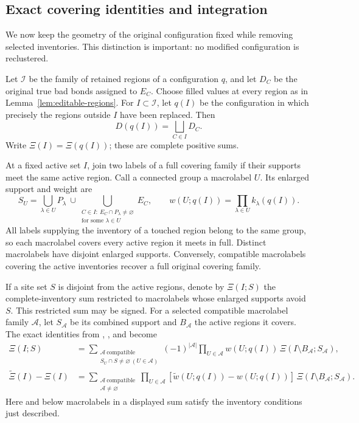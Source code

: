 \subsection{Exact covering identities and integration}

We now keep the geometry of the original configuration fixed while
removing selected inventories. This distinction is important: no
modified configuration is reclustered.

Let $\mathcal I$ be the family of retained regions of a configuration
$q$, and let $D_C$ be the original true bad bonds assigned to $E_C$.
Choose filled values at every region as in
Lemma~\ref{lem:editable-regions}. For $I\subset\mathcal I$, let $q(I)$
be the configuration in which precisely the regions outside $I$ have
been replaced. Then
\begin{equation}
 D(q(I))=\bigsqcup_{C\in I}D_C.
 \label{eq:comparison-inventory-edit}
\end{equation}
Write $\Xi(I)=\Xi(q(I))$; these are complete positive sums.

At a fixed active set $I$, join two labels of a full covering family
if their supports meet the same active region. Call a connected group
a macrolabel $U$. Its enlarged support and weight are
\[
 S_U=\bigcup_{\lambda\in U}P_\lambda
 \ \cup\!
 \bigcup_{\substack{C\in I:\ E_C\cap P_\lambda\ne\varnothing\\
                                  \text{for some }\lambda\in U}}E_C,
 \qquad
 w(U;q(I))=\prod_{\lambda\in U}k_\lambda(q(I)).
\]
All labels supplying the inventory of a touched region belong to the
same group, so each macrolabel covers every active region it meets
in full. Distinct macrolabels have disjoint enlarged supports.
Conversely, compatible macrolabels covering the active inventories
recover a full original covering family.

If a site set $S$ is disjoint from the active regions, denote by
$\Xi(I;S)$ the complete-inventory sum restricted to macrolabels
whose enlarged supports avoid $S$. This restricted sum may be signed.
For a selected compatible macrolabel family $\mathcal A$, let
$S_{\mathcal A}$ be its combined support and $B_{\mathcal A}$ the
active regions it covers. The exact identities from
, , and
 become
\begin{align}
 \Xi(I;S)
 &=\sum_{\substack{\mathcal A\ \mathrm{compatible}\\
          S_U\cap S\ne\varnothing\ (U\in\mathcal A)}}
 (-1)^{|\mathcal A|}
 \prod_{U\in\mathcal A}w(U;q(I))\,
 \Xi(I\setminus B_{\mathcal A};S_{\mathcal A}),
 \label{eq:comparison-inclusion-exclusion}\\
 \widetilde\Xi(I)-\Xi(I)
 &=\sum_{\substack{\mathcal A\ \mathrm{compatible}\\
                              \mathcal A\ne\varnothing}}
 \prod_{U\in\mathcal A}
       [\widetilde w(U;q(I))-w(U;q(I))]\,
 \Xi(I\setminus B_{\mathcal A};S_{\mathcal A}).
 \label{eq:comparison-difference-identity}
\end{align}
Here and below macrolabels in a displayed sum satisfy the inventory
conditions just described.

